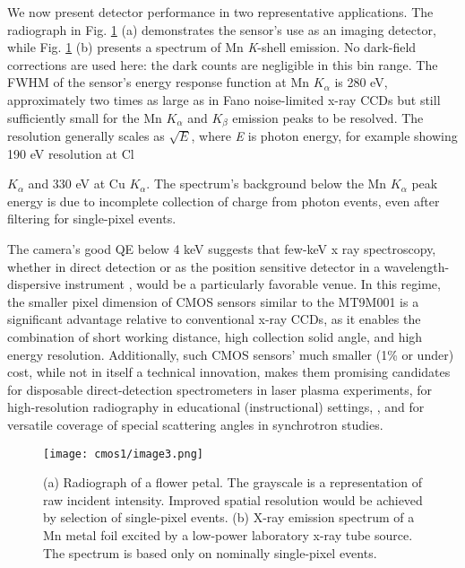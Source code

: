 We now present detector performance in two representative applications.
The radiograph in Fig. \ref{cm1image3} (a) demonstrates the sensor's use as an imaging
detector, while Fig. \ref{cm1image3} (b) presents a spectrum of Mn \emph{K}-shell
emission. No dark-field corrections are used here: the dark counts are
negligible in this bin range. The FWHM of the sensor's energy response
function at Mn \(K_{\alpha}\) is 280 eV, approximately two times as
large as in Fano noise-limited x-ray CCDs but still sufficiently small
for the Mn \(K_{\alpha}\) and \(K_{\beta}\) emission peaks to be
resolved. The resolution generally scales as \(\sqrt{E}\), where
\emph{E} is photon energy, for example showing 190 eV resolution at Cl
\(K_{\alpha}\)
and 330 eV at Cu \(K_{\alpha}\). The spectrum's background below the Mn
\(K_{\alpha}\) peak energy is due to incomplete collection of charge
from photon events, even after filtering for single-pixel events.

The camera's good QE below 4 keV suggests that few-keV x ray
spectroscopy, whether in direct detection or as the position sensitive
detector in a wavelength-dispersive
instrument \cite{HUOTARI2005IMPROVING}, would be a
particularly favorable venue. In this regime, the smaller pixel
dimension of CMOS sensors similar to the MT9M001 is a significant
advantage relative to conventional x-ray CCDs, as it enables the
combination of short working distance, high collection solid angle, and
high energy
resolution.
 \cite{PACOLD2012MINIATURE, MATTERN2012PLASTIC, DICKINSON2008SHORT} Additionally, such
CMOS sensors' much smaller (1\% or under) cost, while not in itself a
technical innovation, makes them promising candidates for disposable
direct-detection spectrometers in laser plasma experiments, for
high-resolution radiography in educational (instructional) settings, ,
and for versatile coverage of special scattering angles in synchrotron
studies.

\begin{figure}[h] \label{cm1image3}
\caption{ (a) Radiograph of a flower petal. The grayscale is a
representation of raw incident intensity. Improved spatial resolution
would be achieved by selection of single-pixel
events. (b) X-ray
emission spectrum of a Mn metal foil excited by a low-power laboratory
x-ray tube source. The spectrum is based only on nominally single-pixel
events.}
\centering
\texttt{[image: cmos1/image3.png]}
\end{figure}


